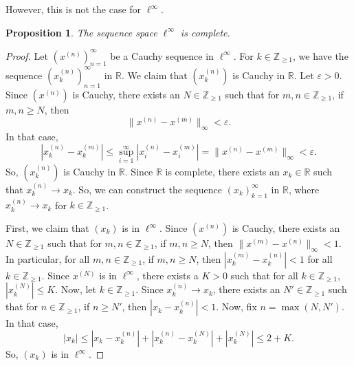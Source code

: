 \documentclass[a4paper, openany]{memoir}
\theoremstyle{definition}
\theoremstyle{plain}
\newtheorem{proposition}[definition]{Proposition}
\begin{document}
However, this is not the case for $\ell^\infty$.
\begin{proposition}
    The sequence space $\ell^\infty$ is complete.
\end{proposition}
\begin{proof}
    Let $(x^{(n)})_{n=1}^\infty$ be a Cauchy sequence in $\ell^\infty$. For $k \in \mathbb{Z}_{\geq 1}$, we have the sequence $(x^{(n)}_k)_{n=1}^\infty$ in $\mathbb{R}$. We claim that $(x^{(n)}_k)$ is Cauchy in $\mathbb{R}$. Let $\varepsilon > 0$. Since $(x^{(n)})$ is Cauchy, there exists an $N \in \mathbb{Z}_{\geq 1}$ such that for $m, n \in \mathbb{Z}_{\geq 1}$, if $m, n \geq N$, then
    \[\lVert x^{(n)} - x^{(m)} \rVert_\infty < \varepsilon.\]
    In that case,
    \[|x_k^{(n)} - x_k^{(m)}| \leq \sup_{i=1}^\infty |x_i^{(n)} - x_i^{(m)}| = \lVert x^{(n)} - x^{(m)} \rVert_\infty < \varepsilon.\]
    So, $(x_k^{(n)})$ is Cauchy in $\mathbb{R}$. Since $\mathbb{R}$ is complete, there exists an $x_k \in \mathbb{R}$ such that $x_k^{(n)} \to x_k$. So, we can construct the sequence $(x_k)_{k=1}^\infty$ in $\mathbb{R}$, where $x_k^{(n)} \to x_k$ for $k \in \mathbb{Z}_{\geq 1}$.

    \noindent First, we claim that $(x_k)$ is in $\ell^\infty$. Since $(x^{(n)})$ is Cauchy, there exists an $N \in \mathbb{Z}_{\geq 1}$ such that for $m, n \in \mathbb{Z}_{\geq 1}$, if $m, n \geq N$, then $\lVert x^{(m)} - x^{(n)} \rVert_\infty < 1$. In particular, for all $m, n \in \mathbb{Z}_{\geq 1}$, if $m, n \geq N$, then $|x^{(m)}_k - x^{(n)}_k| < 1$ for all $k \in \mathbb{Z}_{\geq 1}$. Since $x^{(N)}$ is in $\ell^\infty$, there exists a $K > 0$ such that for all $k \in \mathbb{Z}_{\geq 1}$, $|x_k^{(N)}| \leq K$. Now, let $k \in \mathbb{Z}_{\geq 1}$. Since $x_k^{(n)} \to x_k$, there exists an $N' \in \mathbb{Z}_{\geq 1}$ such that for $n \in \mathbb{Z}_{\geq 1}$, if $n \geq N'$, then $|x_k - x_k^{(n)}| < 1$. Now, fix $n = \max(N, N')$. In that case,
    \[|x_k| \leq |x_k - x_k^{(n)}| + |x_k^{(n)} - x_k^{(N)}| + |x_k^{(N)}| \leq 2 + K.\]
    So, $(x_k)$ is in $\ell^\infty$.


\end{proof}
\end{document}
